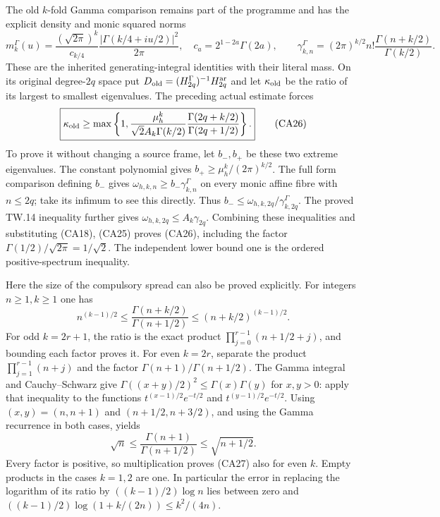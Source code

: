 The old $k$-fold Gamma comparison remains part of the programme and has
the explicit density and monic squared norms
\[
 m_k^\Gamma(u)=\frac{(\sqrt{2\pi})^k}{c_{k/4}}
 \frac{|\Gamma(k/4+iu/2)|^2}{2\pi},\quad
 c_a=2^{1-2a}\Gamma(2a),\qquad
 \gamma_{k,n}^{\Gamma}=(2\pi)^{k/2}
 n!\frac{\Gamma(n+k/2)}{\Gamma(k/2)}.
 \tag{CA25}
\]
These are the inherited generating-integral identities with their
literal mass.  On its original degree-$2q$ space put
$D_{\rm old}=(H_{2q}^{\Gamma})^{-1}H_{2q}^{\rm ar}$ and let
$\kappa_{\rm old}$ be the ratio of its largest to smallest eigenvalues.
The preceding actual estimate forces
\[
 \boxed{\kappa_{\rm old}\ge
 \max\left\{1,
 \frac{\mu_h^k}{\sqrt2 A_k\Gamma(k/2)}
 \frac{\Gamma(2q+k/2)}{\Gamma(2q+1/2)}\right\}.}
 \tag{CA26}
\]
To prove it without changing a source frame, let $b_-,b_+$ be these two
extreme eigenvalues.  The constant polynomial gives
$b_+\ge\mu_h^k/(2\pi)^{k/2}$.  The full form comparison defining
$b_-$ gives $\omega_{h,k,n}\ge b_-\gamma_{k,n}^{\Gamma}$ on every
monic affine fibre with $n\le2q$; take its infimum to see this directly.
Thus $b_-\le\omega_{h,k,2q}/\gamma_{k,2q}^{\Gamma}$.
The proved TW.14 inequality further gives
$\omega_{h,k,2q}\le A_k\gamma_{2q}$.  Combining these inequalities
and substituting (CA18), (CA25) proves (CA26), including the factor
$\Gamma(1/2)/\sqrt{2\pi}=1/\sqrt2$.  The independent lower bound one
is the ordered positive-spectrum inequality.

Here the size of the compulsory spread can also be proved explicitly.
For integers $n\ge1,k\ge1$ one has
\[
 n^{(k-1)/2}\le
 \frac{\Gamma(n+k/2)}{\Gamma(n+1/2)}
 \le(n+k/2)^{(k-1)/2}.
 \tag{CA27}
\]
For odd $k=2r+1$, the ratio is the exact product
$\prod_{j=0}^{r-1}(n+1/2+j)$, and bounding each factor proves it.
For even $k=2r$, separate the product
$\prod_{j=1}^{r-1}(n+j)$ and the factor
$\Gamma(n+1)/\Gamma(n+1/2)$.  The Gamma integral and Cauchy--Schwarz
give $\Gamma((x+y)/2)^2\le\Gamma(x)\Gamma(y)$ for $x,y>0$:
apply that inequality to the functions
$t^{(x-1)/2}e^{-t/2}$ and $t^{(y-1)/2}e^{-t/2}$.
Using $(x,y)=(n,n+1)$ and $(n+1/2,n+3/2)$, and using the Gamma
recurrence in both cases, yields
\[
 \sqrt n\le\frac{\Gamma(n+1)}{\Gamma(n+1/2)}
 \le\sqrt{n+1/2}.
\]
Every factor is positive, so multiplication proves (CA27) also for
even $k$.  Empty products in the cases $k=1,2$ are one.  In particular
the error in replacing the logarithm of its ratio by
$((k-1)/2)\log n$ lies between zero and
$((k-1)/2)\log(1+k/(2n))\le k^2/(4n)$.

